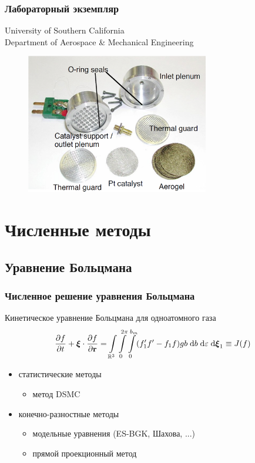 \documentclass[ucs]{beamer}
\newcommand{\dd}{\;\mathrm{d}}
\begin{document}
\begin{frame}
	\frametitle{Лабораторный экземпляр}
	\begin{center}
		University of Southern California \\
		Department of Aerospace \& Mechanical Engineering
	\end{center}
	\begin{figure}
		\includegraphics[width=8cm]{ModernInv.png}
	\end{figure}
\end{frame}

\section{Численные методы}

\subsection{Уравнение Больцмана}
\begin{frame}
	\frametitle{Численное решение уравнения Больцмана}
	Кинетическое уравнение Больцмана для одноатомного газа
	\[
		{\partial{f} \over \partial{t}} + \boldsymbol{\xi} \cdot {\partial{f} \over \partial\mathbf{r}} = 
		\int\limits_{\mathbb R^3} \int\limits_0^{2\pi} \int\limits_0^{b_m} 
		(f_1' f' - f_1 f) gb \dd{b} \dd\varepsilon \dd\boldsymbol\xi_1 \equiv J(f)
	\]
	\begin{itemize}
		\item статистические методы
		\begin{itemize}
			\item метод DSMC
		\end{itemize}
		\item конечно-разностные методы
		\begin{itemize}
			\item модельные уравнения (ES-BGK, Шахова, ...)
			\item \alert{прямой проекционный метод}
		\end{itemize}
	\end{itemize}
\end{frame}
\end{document}
